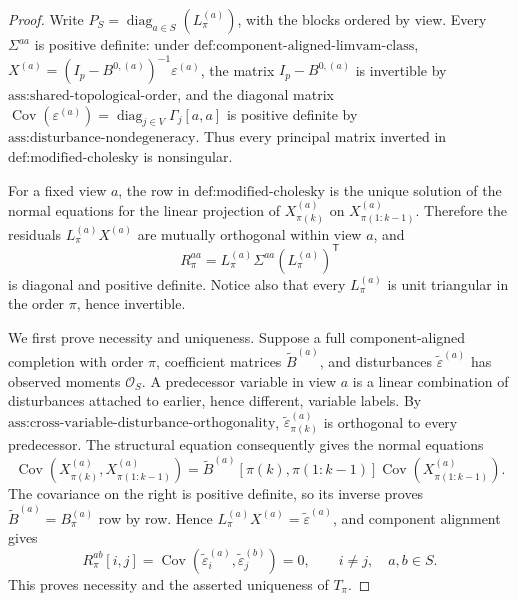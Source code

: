 \documentclass{article}
\begin{document}
\begin{proof}
Write \(P_S=\operatorname{diag}_{a\in S}(L_\pi^{(a)})\), with the blocks ordered by view.  Every \(\Sigma^{aa}\) is positive definite: under \(\text{def:component-aligned-limvam-class}\), \(X^{(a)}=(I_p-B^{0,(a)})^{-1}\varepsilon^{(a)}\), the matrix \(I_p-B^{0,(a)}\) is invertible by \(\text{ass:shared-topological-order}\), and the diagonal matrix \(\operatorname{Cov}(\varepsilon^{(a)})=\operatorname{diag}_{j\in V}\Gamma_j[a,a]\) is positive definite by \(\text{ass:disturbance-nondegeneracy}\).  Thus every principal matrix inverted in \(\text{def:modified-cholesky}\) is nonsingular.

For a fixed view \(a\), the row in \(\text{def:modified-cholesky}\) is the unique solution of the normal equations for the linear projection of \(X_{\pi(k)}^{(a)}\) on \(X_{\pi(1:k-1)}^{(a)}\).  Therefore the residuals \(L_\pi^{(a)}X^{(a)}\) are mutually orthogonal within view \(a\), and
\[
R_\pi^{aa}=L_\pi^{(a)}\Sigma^{aa}(L_\pi^{(a)})^{\mathsf T}
\]
is diagonal and positive definite.  Notice also that every \(L_\pi^{(a)}\) is unit triangular in the order \(\pi\), hence invertible.

We first prove necessity and uniqueness.  Suppose a full component-aligned completion with order \(\pi\), coefficient matrices \(\widetilde B^{(a)}\), and disturbances \(\widetilde\varepsilon^{(a)}\) has observed moments \(\mathcal O_S\).  A predecessor variable in view \(a\) is a linear combination of disturbances attached to earlier, hence different, variable labels.  By \(\text{ass:cross-variable-disturbance-orthogonality}\), \(\widetilde\varepsilon_{\pi(k)}^{(a)}\) is orthogonal to every predecessor.  The structural equation consequently gives the normal equations
\[
\operatorname{Cov}\!\left(X_{\pi(k)}^{(a)},X_{\pi(1:k-1)}^{(a)}\right)
=\widetilde B^{(a)}[\pi(k),\pi(1:k-1)]
\operatorname{Cov}\!\left(X_{\pi(1:k-1)}^{(a)}\right).
\]
The covariance on the right is positive definite, so its inverse proves \(\widetilde B^{(a)}=B_\pi^{(a)}\) row by row.  Hence \(L_\pi^{(a)}X^{(a)}=\widetilde\varepsilon^{(a)}\), and component alignment gives
\[
R_\pi^{ab}[i,j]=\operatorname{Cov}\!\left(\widetilde\varepsilon_i^{(a)},\widetilde\varepsilon_j^{(b)}\right)=0,\qquad i\ne j,\quad a,b\in S.
\]
This proves necessity and the asserted uniqueness of \(T_\pi\).


\end{proof}
\end{document}
